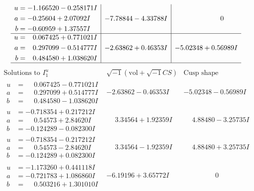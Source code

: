 \documentclass[1p]{elsarticle_modified}
\theoremstyle{definition}
\newcommand{\I}{\sqrt{-1}}
\begin{document}
$$\begin{array}{c|c|c}
\begin{aligned}
u &= -1.166520 - 0.258171 I \\
a &= -0.25604 + 2.07092 I \\
b &= -0.60959 + 1.37557 I\end{aligned}
 & -7.78844 - 4.33788 I & \phantom{-0.000000 } 0 \\ \hline\begin{aligned}
u &= \phantom{-}0.067425 + 0.771021 I \\
a &= \phantom{-}0.297099 - 0.514777 I \\
b &= \phantom{-}0.484580 + 1.038620 I\end{aligned}
 & -2.63862 + 0.46353 I & -5.02348 + 0.56989 I\\
 \hline 
 \end{array}$$\newpage$$\begin{array}{c|c|c}  
\text{Solutions to }I^u_{1}& \I (\text{vol} + \sqrt{-1}CS) & \text{Cusp shape}\\
 \hline 
\begin{aligned}
u &= \phantom{-}0.067425 - 0.771021 I \\
a &= \phantom{-}0.297099 + 0.514777 I \\
b &= \phantom{-}0.484580 - 1.038620 I\end{aligned}
 & -2.63862 - 0.46353 I & -5.02348 - 0.56989 I \\ \hline\begin{aligned}
u &= -0.718354 + 0.217212 I \\
a &= \phantom{-}0.54573 + 2.84620 I \\
b &= -0.124289 - 0.082300 I\end{aligned}
 & \phantom{-}3.34564 + 1.92359 I & \phantom{-}4.88480 - 3.25735 I \\ \hline\begin{aligned}
u &= -0.718354 - 0.217212 I \\
a &= \phantom{-}0.54573 - 2.84620 I \\
b &= -0.124289 + 0.082300 I\end{aligned}
 & \phantom{-}3.34564 - 1.92359 I & \phantom{-}4.88480 + 3.25735 I \\ \hline\begin{aligned}
u &= -1.173260 + 0.441118 I \\
a &= -0.721783 + 1.086860 I \\
b &= \phantom{-}0.503216 + 1.301010 I\end{aligned}
 & -6.19196 + 3.65772 I & \phantom{-0.000000 } 0 \\ \hline\begin{aligned}

\end{aligned}
\end{array}$$
\end{document}
